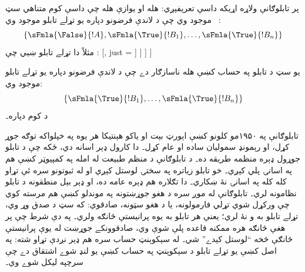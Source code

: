 \documentclass[12pt,a4paper,oneside]{report}
\newcommand{\olfileid}[3]{\gdef\pspart{#1}\gdef\pschapter{#2}\gdef\pssection{#3}}
\gdef\pspart{#2}\gdef\pschapter{#3}\gdef\pssection{}%
\newenvironment{oltableau}
  {\center\LTR\tableau{}}
  {\endtableau\endLTR\endcenter}
\theoremstyle{definition}
\begin{document}
\label{olpseg:OLP-0067-B008:start}
پر تابلوګانې ولاړه \LR{$\Proves$} اړيکه داسې تعريفېږي:
 هله او يوازې هله چې داسې کوم متناهي سټ
~ موجود وي چې د
لاندې فرضونو دپاره يو تړلے تابلو موجود وي:
\[
\{\sFmla{\False}{!A}, \sFmla{\True}{!B_1}, \dots, \sFmla{\True}{!B_n}\} 
\]
مثلاً دا تړلے تابلو ښيي چې :
\begin{oltableau}
  [, just = \TAss
    [\sFmla{\True}{\formula{A} \land \formula{B}}, just = {\TRule{\False}{\lif}[1]}
      [\sFmla{\False}{\formula{A}}, just = {\TRule{\False}{\lif}[1]}
        [\sFmla{\True}{\formula{A}}, just = {\TRule{\True}{\lif}[2]}
          [\sFmla{\True}{\formula{B}}, just = {\TRule{\True}{\lif}[2]}, close]
        ]
      ]
    ]
  ]
\end{oltableau}
\label{olpseg:OLP-0067-B008:end}

\label{olpseg:OLP-0067-B009:start}
يو سټ \LR{$\Gamma$} د تابلو په حساب کښې هله ناسازګار دے چې د
لاندې فرضونو دپاره يو تړلے تابلو موجود وي:
\[
\{\sFmla{\True}{!B_1}, \dots, \sFmla{\True}{!B_n}\} 
\]
د کوم  دپاره۔
\label{olpseg:OLP-0067-B009:end}

\label{olpseg:OLP-0067-B010:start}
تابلوګانې په ۱۹۵۰مو کلونو کښې اېورټ بېت او ياکو هېنتيکا هر يوه
په خپلواکه توګه جوړ کړل، او رېمونډ سموليان ساده او عام کړل۔ دا کارول
ډېر اسانه دي، ځکه چې د تابلو جوړول ډېره منظمه طريقه ده۔ د
تابلوګانې د منظم طبيعت له امله په کمپيوټر کښې هم په اسانۍ پلي
کېږي۔ خو تابلو زياتره په سختۍ لوستل کېږي او له ثبوتونو سره ئې
تړاو کله کله په اسانۍ نۀ ښکاري۔ دا تګلاره هم ډېره عامه ده، او ډېر
بېل منطقونه د تابلو نظامونه لري۔ تابلوګانې له موږ سره د
هغو جوړښتونه په موندلو کښې هم مرسته کوي چې ورکړل شوي
تړلي فارمولونه، يا د هغو سټونه، صادقوي: که سټ د صدق وړ وي، تړلے
تابلو به و نۀ لري؛ يعنې هر تابلو به يوه پرانيستې څانګه
ولري۔ په دې شرط چې پر هغې څانګه هره ممکنه قاعده پلې شوې وي،
صادقوونکے جوړښت له يوې پرانيستې څانګې څخه ``لوستل کېدے''
شي۔ له سېکوېنټ حساب سره هم ډېر نږدې تړاو شته: په اصل کښې يو تړلے
تابلو د سېکوېنټ په حساب کښې يو لنډ شوے اشتقاق دے چې
سرچپه ليکل شوے وي۔
\label{olpseg:OLP-0067-B010:end}

\label{olpseg:OLP-0068-B004:start}
\olfileid{fol}{prf}{axd}
\label{olpseg:OLP-0068-B004:end}

\label{olpseg:OLP-0068-B005:start}
\label{olpseg:OLP-0068-B005:end}
\end{document}
